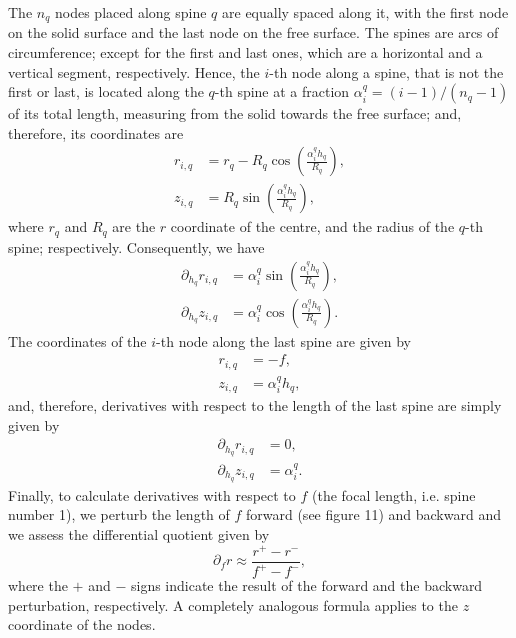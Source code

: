 \documentclass{article}
\begin{document}
The \(n_q\) nodes placed along spine \(q\) are equally spaced along it, with the first node on the solid surface and the last node on the free surface. The spines are arcs of circumference; except for the first and last ones, which are a horizontal and a vertical segment, respectively. Hence, the \(i\)-th node along a spine, that is not the first or last, is located along the \(q\)-th spine at a fraction \(\alpha_i^q = (i-1)/(n_q-1)\) of its total length, measuring from the solid towards the free surface; and, therefore, its coordinates are
\begin{align}
r_{i,q} &= r_q - R_q \cos\left( \frac{\alpha_i^q h_q}{R_q} \right), \tag{22.1}\\
z_{i,q} &= R_q \sin\left( \frac{\alpha_i^q h_q}{R_q} \right), \tag{22.2}
\end{align}
where \(r_q\) and \(R_q\) are the \(r\) coordinate of the centre, and the radius of the \(q\)-th spine; respectively. Consequently, we have
\begin{align}
\partial_{h_q} r_{i,q} &= \alpha_i^q \sin\left( \frac{\alpha_i^q h_q}{R_q} \right), \tag{22.3}\\
\partial_{h_q} z_{i,q} &= \alpha_i^q \cos\left( \frac{\alpha_i^q h_q}{R_q} \right). \tag{22.4}
\end{align}
The coordinates of the \(i\)-th node along the last spine are given by
\begin{align}
r_{i,q} &= -f, \tag{22.5}\\
z_{i,q} &= \alpha_i^q h_q, \tag{22.6}
\end{align}
and, therefore, derivatives with respect to the length of the last spine are simply given by
\begin{align}
\partial_{h_q} r_{i,q} &= 0, \tag{22.7}\\
\partial_{h_q} z_{i,q} &= \alpha_i^q. \tag{22.8}
\end{align}
Finally, to calculate derivatives with respect to \(f\) (the focal length, i.e. spine number 1), we perturb the length of \(f\) forward (see figure 11) and backward and we assess the differential quotient given by
\begin{equation}
\partial_f r \approx \frac{r^+ - r^-}{f^+ - f^-}, \tag{22.9}
\end{equation}
where the \(+\) and \(-\) signs indicate the result of the forward and the backward perturbation, respectively. A completely analogous formula applies to the \(z\) coordinate of the nodes.
\end{document}
